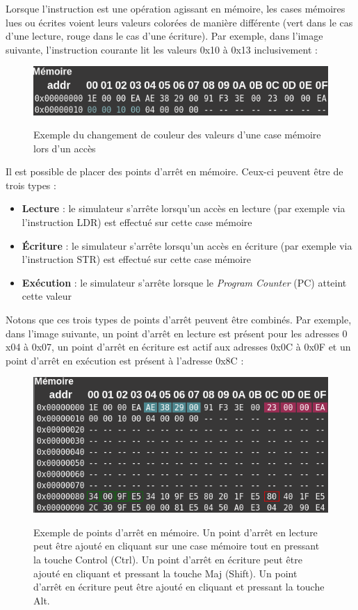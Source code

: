 \documentclass{tufte-handout}
\begin{document}
Lorsque l'instruction est une opération agissant en mémoire, les cases mémoires lues ou écrites voient leurs valeurs colorées de manière différente (vert dans le cas d'une lecture, rouge dans le cas d'une écriture). Par exemple, dans l'image suivante, l'instruction courante lit les valeurs $0$x10 à $0$x13 inclusivement :
\begin{figure}[h!]
\raggedleft
\includegraphics[width=0.8\linewidth]{pics/memoire_acces.png}
\label{f:memoireacces}
\caption{Exemple du changement de couleur des valeurs d'une case mémoire lors d'un accès}
\end{figure}

Il est possible de placer des points d'arrêt en mémoire. Ceux-ci peuvent être de trois types :
\begin{itemize}
	\item \textbf{Lecture} : le simulateur s'arrête lorsqu'un accès en lecture (par exemple via l'instruction LDR) est effectué sur cette case mémoire
	\item \textbf{Écriture} : le simulateur s'arrête lorsqu'un accès en écriture (par exemple via l'instruction STR) est effectué sur cette case mémoire
	\item \textbf{Exécution} : le simulateur s'arrête lorsque le \textit{Program Counter} (PC) atteint cette valeur
\end{itemize}
Notons que ces trois types de points d'arrêt peuvent être combinés. Par exemple, dans l'image suivante, un point d'arrêt en lecture est présent pour les adresses $0$x04 à $0$x07, un point d'arrêt en écriture est actif aux adresses $0$x0C à $0$x0F et un point d'arrêt en exécution est présent à l'adresse $0$x8C :
\begin{figure}[h!]
\raggedleft
\includegraphics[width=0.8\linewidth]{pics/memoire_bkpt.png}
\label{f:memoirebkpt}
\caption{Exemple de points d'arrêt en mémoire. Un point d'arrêt en lecture peut être ajouté en cliquant sur une case mémoire tout en pressant la touche Control (Ctrl). Un point d'arrêt en écriture peut être ajouté en cliquant et pressant la touche Maj (Shift). Un point d'arrêt en écriture peut être ajouté en cliquant et pressant la touche Alt.}
\end{figure}
\end{document}
